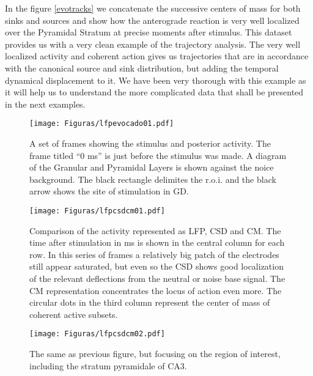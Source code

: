\documentclass[12pt]{article}
\begin{document}
In the figure \ref{evotracks} we concatenate the successive centers of mass
for both sinks and sources and show how the anterograde reaction is
very well localized over the Pyramidal Stratum at precise moments after
stimulus. This dataset provides us with a very clean example of the
trajectory analysis. The very well localized activity and coherent
action gives us trajectories that are in accordance with the canonical
source and sink distribution, but adding the temporal dynamical displacement
to it. We have been very thorough with this example as it will help us
to understand the more complicated data that shall be presented in
the next examples. 



\begin{figure}
  \texttt{[image: Figuras/lfpevocado01.pdf]}
  \caption{A set of frames showing the stimulus and posterior activity.
    The frame titled ``0 ms'' is just before the stimulus was
    made.  A diagram of the Granular and Pyramidal Layers is shown
    against the noice background. The black rectangle delimites the
    r.o.i. and the black arrow shows the site of stimulation in GD.
  }\label{lfpevocada}
\end{figure}

\begin{figure}[h]
\texttt{[image: Figuras/lfpcsdcm01.pdf]}
\caption{ Comparison of the activity represented as LFP, CSD and CM.
  The time after
  stimulation in ms is shown in the central column for each row.
  In this series of frames a relatively big patch of the electrodes
  still appear saturated, but even so the CSD shows good localization
  of the relevant deflections from the neutral or noise base signal.
  The CM representation concentrates the locus of action even more.
  The circular dots in the third column represent the center of mass
  of coherent active subsets.
}\label{lfpcsdcm}
\end{figure}



\begin{figure}[h]
\texttt{[image: Figuras/lfpcsdcm02.pdf]}
\caption{ The same as previous figure, but focusing on the
  region of interest, including the stratum pyramidale of CA3.
}\label{lfpcsdcmsub}
\end{figure}
\end{document}
